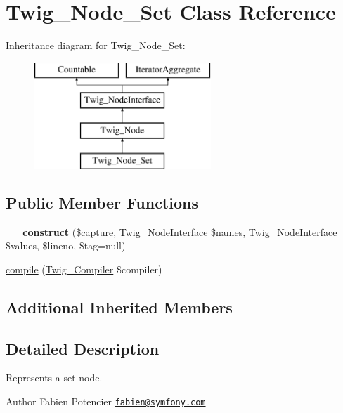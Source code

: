 \hypertarget{classTwig__Node__Set}{}\section{Twig\+\_\+\+Node\+\_\+\+Set Class Reference}
\label{classTwig__Node__Set}
Inheritance diagram for Twig\+\_\+\+Node\+\_\+\+Set\+:\begin{figure}[H]
\begin{center}
\leavevmode
\includegraphics[height=4.000000cm]{classTwig__Node__Set}
\end{center}
\end{figure}
\subsection*{Public Member Functions}
\begin{DoxyCompactItemize}
\item 
{\bfseries \+\_\+\+\_\+construct} (\$capture, \hyperlink{interfaceTwig__NodeInterface}{Twig\+\_\+\+Node\+Interface} \$names, \hyperlink{interfaceTwig__NodeInterface}{Twig\+\_\+\+Node\+Interface} \$values, \$lineno, \$tag=null)\hypertarget{classTwig__Node__Set_af4da6d09b5eb66a52f233ace2cbb1dd6}{}\label{classTwig__Node__Set_af4da6d09b5eb66a52f233ace2cbb1dd6}

\item 
\hyperlink{classTwig__Node__Set_aa4bd2aebe79c9218f9823b871069c44c}{compile} (\hyperlink{classTwig__Compiler}{Twig\+\_\+\+Compiler} \$compiler)
\end{DoxyCompactItemize}
\subsection*{Additional Inherited Members}


\subsection{Detailed Description}
Represents a set node.

\begin{DoxyAuthor}{Author}
Fabien Potencier \href{mailto:fabien@symfony.com}{\tt fabien@symfony.\+com} 
\end{DoxyAuthor}


